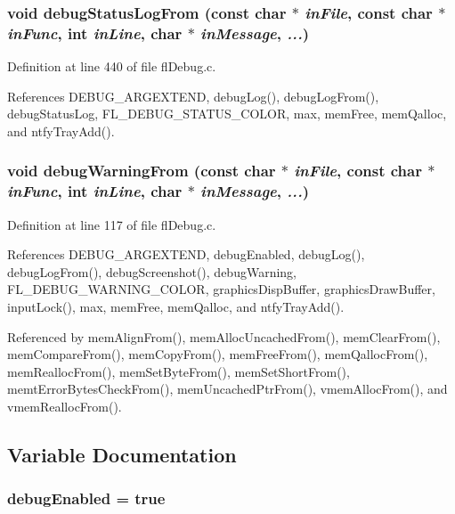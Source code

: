 \subsubsection{\setlength{\rightskip}{0pt plus 5cm}void debug\-Status\-Log\-From (const char $\ast$ {\em in\-File}, const char $\ast$ {\em in\-Func}, int {\em in\-Line}, char $\ast$ {\em in\-Message},  {\em ...})}\label{flDebug_8c_3a1508e1b415b6a03753a186799d5258}




Definition at line 440 of file fl\-Debug.c.

References DEBUG\_\-ARGEXTEND, debug\-Log(), debug\-Log\-From(), debug\-Status\-Log, FL\_\-DEBUG\_\-STATUS\_\-COLOR, max, mem\-Free, mem\-Qalloc, and ntfy\-Tray\-Add().
\subsubsection{\setlength{\rightskip}{0pt plus 5cm}void debug\-Warning\-From (const char $\ast$ {\em in\-File}, const char $\ast$ {\em in\-Func}, int {\em in\-Line}, char $\ast$ {\em in\-Message},  {\em ...})}\label{flDebug_8c_8ae2b8f15c4362510e8ea880ca4f688c}




Definition at line 117 of file fl\-Debug.c.

References DEBUG\_\-ARGEXTEND, debug\-Enabled, debug\-Log(), debug\-Log\-From(), debug\-Screenshot(), debug\-Warning, FL\_\-DEBUG\_\-WARNING\_\-COLOR, graphics\-Disp\-Buffer, graphics\-Draw\-Buffer, input\-Lock(), max, mem\-Free, mem\-Qalloc, and ntfy\-Tray\-Add().

Referenced by mem\-Align\-From(), mem\-Alloc\-Uncached\-From(), mem\-Clear\-From(), mem\-Compare\-From(), mem\-Copy\-From(), mem\-Free\-From(), mem\-Qalloc\-From(), mem\-Realloc\-From(), mem\-Set\-Byte\-From(), mem\-Set\-Short\-From(), memt\-Error\-Bytes\-Check\-From(), mem\-Uncached\-Ptr\-From(), vmem\-Alloc\-From(), and vmem\-Realloc\-From().

\subsection{Variable Documentation}
\subsubsection{ {\bf debug\-Enabled} = true}\label{flDebug_8c_d0344eb1bc475981a837e350c08fb53a}


